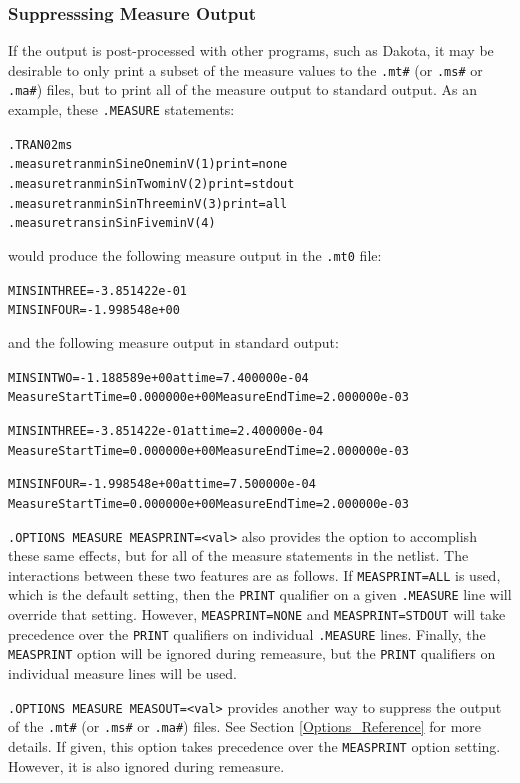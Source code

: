 \subsubsection{Suppresssing Measure Output}
\label{Measure_Suppressing_Measure_Output}
If the \Xyce{} output is post-processed with other programs, such as
Dakota, it may be desirable to only print a subset of the measure
values to the \texttt{.mt\#} (or \texttt{.ms\#} or \texttt{.ma\#})
files, but to print all of the measure output to standard output.  As
an example, these {\tt .MEASURE} statements:
\begin{alltt}
.TRAN 0  2ms
.measure tran minSineOne  min V(1) print=none
.measure tran minSinTwo   min V(2) print=stdout
.measure tran minSinThree min V(3) print=all
.measure tran sinSinFive  min V(4)
\end{alltt}
would produce the following measure output in the {\tt .mt0} file:
\begin{alltt}
MINSINTHREE = -3.851422e-01
MINSINFOUR = -1.998548e+00
\end{alltt}
and the following measure output in standard output:
\begin{alltt}
MINSINTWO = -1.188589e+00 at time = 7.400000e-04
Measure Start Time= 0.000000e+00	Measure End Time= 2.000000e-03

MINSINTHREE = -3.851422e-01 at time = 2.400000e-04
Measure Start Time= 0.000000e+00	Measure End Time= 2.000000e-03

MINSINFOUR = -1.998548e+00 at time = 7.500000e-04
Measure Start Time= 0.000000e+00	Measure End Time= 2.000000e-03
\end{alltt}

\texttt{.OPTIONS MEASURE MEASPRINT=<val>} also provides the option to accomplish
these same effects, but for all of the measure statements in the
netlist.  The interactions between these two features are as follows.
If \texttt{MEASPRINT=ALL} is used, which is the default setting, then
the \texttt{PRINT} qualifier on a given
\texttt{.MEASURE} line will override that setting.  However,
\texttt{MEASPRINT=NONE}
and \texttt{MEASPRINT=STDOUT} will take precedence over
the \texttt{PRINT} qualifiers on individual \texttt{.MEASURE} lines.
Finally, the \texttt{MEASPRINT} option will be ignored during
remeasure, but the \texttt{PRINT} qualifiers on individual measure
lines will be used.

\texttt{.OPTIONS MEASURE MEASOUT=<val>} provides another way to suppress the output
of the \texttt{.mt\#} (or \texttt{.ms\#} or \texttt{.ma\#}) files.
See Section \ref{Options_Reference} for more details.  If given, this
option takes precedence over the \texttt{MEASPRINT} option setting.
However, it is also ignored during remeasure.

